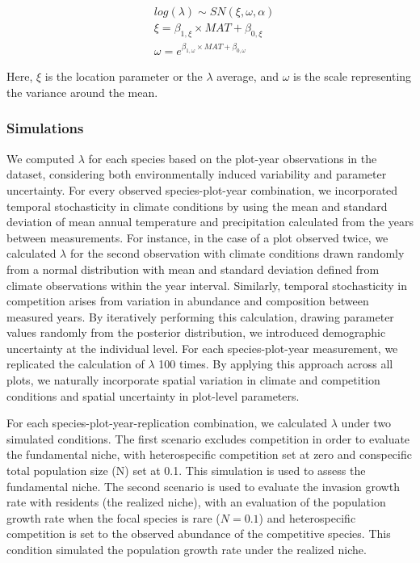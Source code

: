 \begin{equation}
\begin{split}
&log(\lambda) \sim SN(\xi, \omega, \alpha) \\[2pt]
&\xi = \beta_{1, \xi} \times MAT + \beta_{0, \xi} \\[2pt]
&\omega = e^{\beta_{1, \omega} \times MAT + \beta_{0, \omega}}
\end{split}
\label{eq:metamodel}\end{equation}

Here, \(\xi\) is the location parameter or the \(\lambda\) average, and
\(\omega\) is the scale representing the variance around the mean.

\hypertarget{simulations}{%
\subsubsection{Simulations}\label{simulations}}

We computed \(\lambda\) for each species based on the plot-year
observations in the dataset, considering both environmentally induced
variability and parameter uncertainty. For every observed
species-plot-year combination, we incorporated temporal stochasticity in
climate conditions by using the mean and standard deviation of mean
annual temperature and precipitation calculated from the years between
measurements. For instance, in the case of a plot observed twice, we
calculated \(\lambda\) for the second observation with climate
conditions drawn randomly from a normal distribution with mean and
standard deviation defined from climate observations within the year
interval. Similarly, temporal stochasticity in competition arises from
variation in abundance and composition between measured years. By
iteratively performing this calculation, drawing parameter values
randomly from the posterior distribution, we introduced demographic
uncertainty at the individual level. For each species-plot-year
measurement, we replicated the calculation of \(\lambda\) 100 times. By
applying this approach across all plots, we naturally incorporate
spatial variation in climate and competition conditions and spatial
uncertainty in plot-level parameters.

For each species-plot-year-replication combination, we calculated
\(\lambda\) under two simulated conditions. The first scenario excludes
competition in order to evaluate the fundamental niche, with
heterospecific competition set at zero and conspecific total population
size (N) set at 0.1. This simulation is used to assess the fundamental
niche. The second scenario is used to evaluate the invasion growth rate
with residents (the realized niche), with an evaluation of the
population growth rate when the focal species is rare (\(N=0.1\)) and
heterospecific competition is set to the observed abundance of the
competitive species. This condition simulated the population growth rate
under the realized niche.

